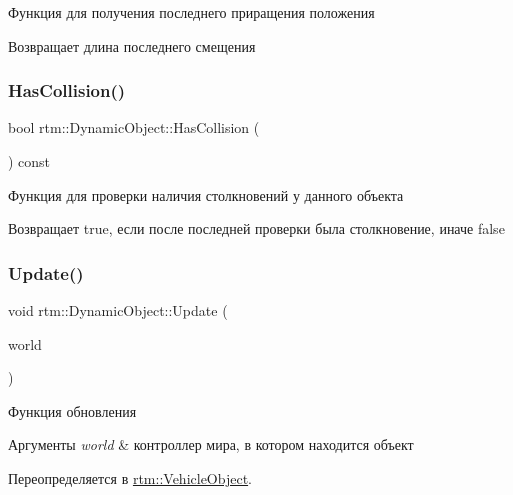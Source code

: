 Функция для получения последнего приращения положения \begin{DoxyReturn}{Возвращает}
длина последнего смещения 
\end{DoxyReturn}
\mbox{\label{classrtm_1_1_dynamic_object_a0bc9390b78faf5c770bff86a2e451ec6}} 
\subsubsection{\texorpdfstring{Has\+Collision()}{HasCollision()}}
{\footnotesize\ttfamily bool rtm\+::\+Dynamic\+Object\+::\+Has\+Collision (\begin{DoxyParamCaption}{ }\end{DoxyParamCaption}) const}

Функция для проверки наличия столкновений у данного объекта \begin{DoxyReturn}{Возвращает}
true, если после последней проверки была столкновение, иначе false 
\end{DoxyReturn}
\mbox{\label{classrtm_1_1_dynamic_object_a2b2a4072f80d6be9c8d1097bc072197e}} 
\subsubsection{\texorpdfstring{Update()}{Update()}}
{\footnotesize\ttfamily void rtm\+::\+Dynamic\+Object\+::\+Update (\begin{DoxyParamCaption}\item[{\hyperlink{classrtm_1_1_world_controller}{World\+Controller} $\ast$const}]{world }\end{DoxyParamCaption})\hspace{0.3cm}{\ttfamily [virtual]}}

Функция обновления 
\begin{DoxyParams}{Аргументы}
{\em world} & контроллер мира, в котором находится объект \\
\hline
\end{DoxyParams}


Переопределяется в \hyperlink{classrtm_1_1_vehicle_object_a1e089c8acf528660417a21c75658d546}{rtm\+::\+Vehicle\+Object}.

